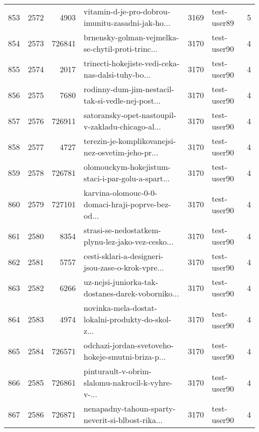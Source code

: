 \begin{tabular}{lrrlrlr}
853  &       2572 &     4903 &  vitamin-d-je-pro-dobrou-imunitu-zasadni-jak-ho... &     3169 &                  test-user89 &               5 \\
854  &       2573 &   726841 &  brnensky-golman-vejmelka-se-chytil-proti-trinc... &     3170 &                  test-user90 &               4 \\
855  &       2574 &     2017 &  trinecti-hokejiste-vedi-ceka-nas-dalsi-tuhy-bo... &     3170 &                  test-user90 &               4 \\
856  &       2575 &     7680 &  rodinny-dum-jim-nestacil-tak-si-vedle-nej-post... &     3170 &                  test-user90 &               4 \\
857  &       2576 &   726911 &  satoransky-opet-nastoupil-v-zakladu-chicago-al... &     3170 &                  test-user90 &               4 \\
858  &       2577 &     4727 &  terezin-je-komplikovanejsi-nez-osvetim-jeho-pr... &     3170 &                  test-user90 &               4 \\
859  &       2578 &   726781 &  olomouckym-hokejistum-staci-i-par-golu-a-spart... &     3170 &                  test-user90 &               4 \\
860  &       2579 &   727101 &  karvina-olomouc-0-0-domaci-hraji-poprve-bez-od... &     3170 &                  test-user90 &               4 \\
861  &       2580 &     8354 &  strasi-se-nedostatkem-plynu-lez-jako-vez-cesko... &     3170 &                  test-user90 &               4 \\
862  &       2581 &     5757 &  cesti-sklari-a-designeri-jsou-zase-o-krok-vpre... &     3170 &                  test-user90 &               4 \\
863  &       2582 &     6266 &  uz-nejsi-juniorka-tak-dostanes-darek-voborniko... &     3170 &                  test-user90 &               4 \\
864  &       2583 &     4974 &  novinka-mela-dostat-lokalni-produkty-do-skol-z... &     3170 &                  test-user90 &               4 \\
865  &       2584 &   726571 &  odchazi-jordan-svetoveho-hokeje-smutni-briza-p... &     3170 &                  test-user90 &               4 \\
866  &       2585 &   726861 &  pinturault-v-obrim-slalomu-nakrocil-k-vyhre-v-... &     3170 &                  test-user90 &               4 \\
867  &       2586 &   726871 &  nenapadny-tahoun-sparty-neverit-si-blbost-rika... &     3170 &                  test-user90 &               4 \\

\end{tabular}
